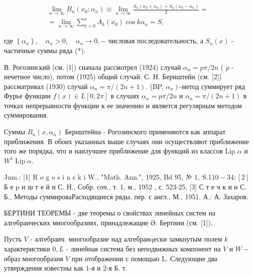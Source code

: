 \documentclass[10pt]{article}
\begin{document}
\[

\begin{gathered}

\lim _{n \rightarrow \infty} B_{n}\left(x_{0} ; \alpha_{n}\right) \equiv \lim _{n \rightarrow \infty} \frac{S_{n}\left(x_{0}+\alpha_{n}\right)+S_{n}\left(x_{0}-\alpha_{n}\right)}{2}= \\

=\lim _{n \rightarrow \infty} \sum_{k=0}^{n} A_{k}\left(x_{0}\right) \cos k \alpha_{n}=S,

\end{gathered}

\]



где $\left\{\alpha_{n}\right\}, \quad \alpha_{n}>0, \quad \alpha_{n} \rightarrow 0,-$ числовая последовательность, а $S_{n}(x)$ - частичные суммы ряда (*).



В. Рогозинский (см. [1]) сначала рассмотрел (1924) случай $\alpha_{n}=p \pi / 2 n$ ( $p$ - нечетное число), потом (1925) общий случай. С. Н. Бернштейн (см. [2]) рассматривал (1930) случай $\alpha_{n}=\pi /(2 n+1)$. (BP, $\left.\alpha_{n}\right)$-метод суммирует ряд Фурье функции $f(x) \in L[0,2 \pi]$ в случаях $\alpha_{n}=p \pi / 2 n$ и $\alpha_{n}=\pi /(2 n+1)$ в точках непрерывности функции к ее значению и является регулярным методом суммирования.



Суммы $B_{n}\left(x, \alpha_{n}\right)$ Бернштейна - Рогозинского применяются как аппарат приближения. В обоих указанных выше случаях они осуществляют приближение того же порядка, что и наилучшее приближение для функций из классов Lip $\alpha$ и $W^{1} \operatorname{Lip} \alpha$.



Jum.: [1] R o g o s i n s k i W., "Math. Ann.", 1925, Bd 95, № $1, \mathrm{~S} .110-34 ;[2]$ Б е p н ш т е й н С. Н., Собр. соч., т. 1, м., 1952 , с. 523-25, [3] С т е ч к и н С. Б., Методы суммироваРасходящиеся ряды, пер. с англ., М., 1951. А.: А. Захаров.



БЕРТИНИ ТЕОРЕМЫ - две теоремы о свойствах линейных систем на алгебраических многообразиях, принадлежащие Ә. Бертини (см. [1]).



Пусть $V$ - алгебраич. многообразие над алгебраиqески замкнутым полем $k$ характеристики $0, L$ - линейная система без неподвижных компонент на $V$ и $W-$ образ многообразия $V$ при отображении с помощью L. Следующие два утверждения известны как 1-я и 2-я Б. т.
\end{document}
